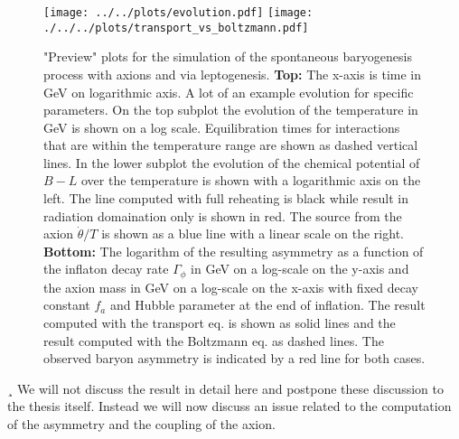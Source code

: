 \documentclass[13pt,a4paper,titlepage]{article}
\begin{document}
\begin{figure}
    \centering
    \texttt{[image: ../../plots/evolution.pdf]} %
    \texttt{[image: ./../../plots/transport\_vs\_boltzmann.pdf]} %
    \caption{"Preview" plots for the simulation of the spontaneous baryogenesis process with axions and via leptogenesis.
    \textbf{Top:} The x-axis is time in GeV on logarithmic axis. A lot of an example evolution for specific parameters. On the top subplot the evolution of the temperature in GeV is shown on a log scale. Equilibration times for interactions that are within the temperature range are shown as dashed vertical lines. In the lower subplot the evolution of the chemical potential of $B - L$ over the temperature is shown with a logarithmic axis on the left. The line computed with full reheating is black while result in radiation domaination only is shown in red. The source from the axion $\dot{\theta} / T$ is shown as a blue line with a linear scale on the right.  \textbf{Bottom:} The logarithm of the resulting asymmetry as a function of the inflaton decay rate $\Gamma_\phi$ in GeV on a log-scale on the y-axis and the axion mass in GeV on a log-scale on the x-axis with fixed decay constant $f_a$ and Hubble parameter at the end of inflation. The result computed with the transport eq. is shown as solid lines and the result computed with the Boltzmann eq. as dashed lines. The observed baryon asymmetry is indicated by a red line for both cases. }
    \label{fig:naive_model_plot}
\end{figure}¸
We will not discuss the result in detail here and postpone these discussion to the thesis itself.
Instead we will now discuss an issue related to the computation of the asymmetry and the coupling of the axion.
\end{document}
